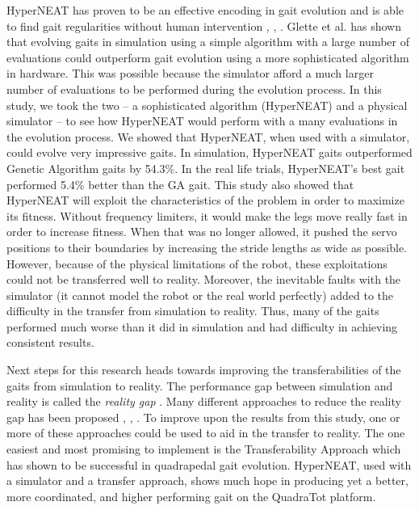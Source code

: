 HyperNEAT has proven to be an effective encoding in gait evolution and is able to find gait regularities without human intervention \cite{clune1}, \cite{clune2}, \cite{yos:clune}. 
Glette et al. \cite{glette} has shown that evolving gaits in simulation using a simple algorithm with a large number of evaluations could outperform gait evolution using a more sophisticated algorithm in hardware.  
This was possible because the simulator afford a much larger number of evaluations to be performed during the evolution process. 
In this study, we took the two -- a sophisticated algorithm (HyperNEAT) and a physical simulator -- to see how HyperNEAT would perform with a many evaluations in the evolution process. 
We showed that HyperNEAT, when used with a simulator, could evolve very impressive gaits. 
In simulation, HyperNEAT gaits outperformed Genetic Algorithm gaits \cite{glette} by 54.3\%. 
In the real life trials, HyperNEAT's best gait performed 5.4\% better than the GA gait. 
This study also showed that HyperNEAT will exploit the characteristics of the problem in order to maximize its fitness.
Without frequency limiters, it would make the legs move really fast in order to increase fitness. 
When that was no longer allowed, it pushed the servo positions to their boundaries by increasing the stride lengths as wide as possible. 
However, because of the physical limitations of the robot, these exploitations could not be transferred well to reality. 
Moreover, the inevitable faults with the simulator (it cannot model the robot or the real world perfectly) added to the difficulty in the transfer from simulation to reality. 
Thus, many of the gaits performed much worse than it did in simulation and had difficulty in achieving consistent results. 


Next steps for this research heads towards improving the transferabilities of the gaits from simulation to reality. 
The performance gap between simulation and reality is called the \emph{reality gap} \cite{jakobi}. 
Many different approaches to reduce the reality gap has been proposed \cite{koos1}, \cite{bongard}, \cite{zagal}.
To improve upon the results from this study, one or more of these approaches could be used to aid in the transfer to reality. 
The one easiest and most promising to implement is the Transferability Approach \cite{koos2} which has shown to be successful in quadrapedal gait evolution. 
HyperNEAT, used with a simulator and a transfer approach, shows much hope in producing yet a better, more coordinated, and higher performing gait on the QuadraTot platform. 
